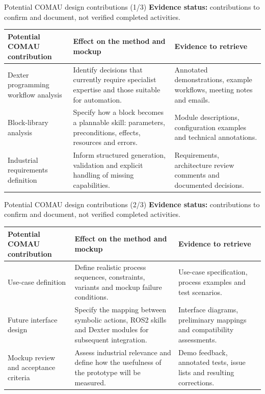 \documentclass[aspectratio=169,11pt]{beamer}
\begin{document}
\begin{frame}{Potential COMAU design contributions (1/3)}
\small
\textbf{Evidence status:} contributions to confirm and document, not verified completed activities.
\medskip
\renewcommand{\arraystretch}{1.35}
\begin{tabularx}{\textwidth}{@{}>{\raggedright\arraybackslash}p{}XX@{}}
\toprule
Potential COMAU contribution & Effect on the method and mockup & Evidence to retrieve\\\midrule
Dexter programming workflow analysis & Identify decisions that currently require specialist expertise and those suitable for automation. & Annotated demonstrations, example workflows, meeting notes and emails.\\
Block-library analysis & Specify how a block becomes a plannable skill: parameters, preconditions, effects, resources and errors. & Module descriptions, configuration examples and technical annotations.\\
Industrial requirements definition & Inform structured generation, validation and explicit handling of missing capabilities. & Requirements, architecture review comments and documented decisions.\\
\bottomrule
\end{tabularx}
\end{frame}

\begin{frame}{Potential COMAU design contributions (2/3)}
\small
\textbf{Evidence status:} contributions to confirm and document, not verified completed activities.
\medskip
\renewcommand{\arraystretch}{1.35}
\begin{tabularx}{\textwidth}{@{}>{\raggedright\arraybackslash}p{}XX@{}}
\toprule
Potential COMAU contribution & Effect on the method and mockup & Evidence to retrieve\\\midrule
Use-case definition & Define realistic process sequences, constraints, variants and mockup failure conditions. & Use-case specification, process examples and test scenarios.\\
Future interface design & Specify the mapping between symbolic actions, ROS2 skills and Dexter modules for subsequent integration. & Interface diagrams, preliminary mappings and compatibility assessments.\\
Mockup review and acceptance criteria & Assess industrial relevance and define how the usefulness of the prototype will be measured. & Demo feedback, annotated tests, issue lists and resulting corrections.\\
\bottomrule
\end{tabularx}
\end{frame}
\end{document}
